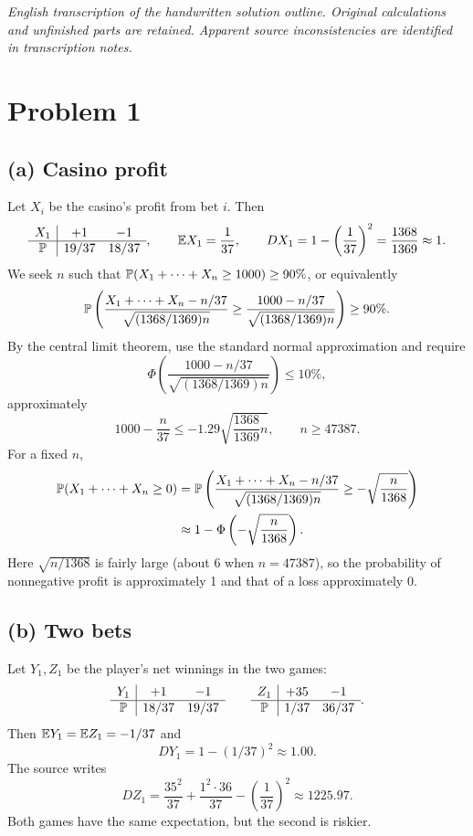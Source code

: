 \documentclass[11pt,a4paper]{article}
\begin{document}
\noindent\emph{English transcription of the handwritten solution outline. Original calculations and unfinished parts are retained. Apparent source inconsistencies are identified in transcription notes.}

\section*{Problem 1}
\subsection*{(a) Casino profit}
Let $X_i$ be the casino's profit from bet $i$. Then
\[
\begin{array}{c|cc}X_1&+1&-1\\\hline\P&19/37&18/37\end{array},
\qquad\E X_1=\frac1{37},\qquad DX_1=1-\left(\frac1{37}\right)^2
=\frac{1368}{1369}\approx1.
\]
We seek $n$ such that $\P(X_1+\cdots+X_n\ge1000)\ge90\%$, or equivalently
\[
\P\left(\frac{X_1+\cdots+X_n-n/37}{\sqrt{(1368/1369)n}}
\ge\frac{1000-n/37}{\sqrt{(1368/1369)n}}\right)\ge90\%.
\]
By the central limit theorem, use the standard normal approximation and require
\[
\Phi\left(\frac{1000-n/37}{\sqrt{(1368/1369)n}}\right)\le10\%,
\]
approximately
\[
1000-\frac n{37}\le-1.29\sqrt{\frac{1368}{1369}n},
\qquad n\ge47387.
\]
For a fixed $n$,
\begin{align*}
\P(X_1+\cdots+X_n\ge0)
&=\P\left(\frac{X_1+\cdots+X_n-n/37}{\sqrt{(1368/1369)n}}
\ge-\sqrt{\frac n{1368}}\right)\\
&\approx1-\Phi\left(-\sqrt{\frac n{1368}}\right).
\end{align*}
Here $\sqrt{n/1368}$ is fairly large (about 6 when $n=47387$), so the probability of nonnegative profit is approximately 1 and that of a loss approximately 0.

\subsection*{(b) Two bets}
Let $Y_1,Z_1$ be the player's net winnings in the two games:
\[
\begin{array}{c|cc}Y_1&+1&-1\\\hline\P&18/37&19/37\end{array}
\qquad
\begin{array}{c|cc}Z_1&+35&-1\\\hline\P&1/37&36/37\end{array}.
\]
Then $\E Y_1=\E Z_1=-1/37$ and
\[
DY_1=1-(1/37)^2\approx1.00.
\]
The source writes
\[
DZ_1=\frac{35^2}{37}+\frac{1^2\cdot36}{37}-\left(\frac1{37}\right)^2
\approx1225.97.\tag{Note 1}
\]
Both games have the same expectation, but the second is riskier.
\end{document}

